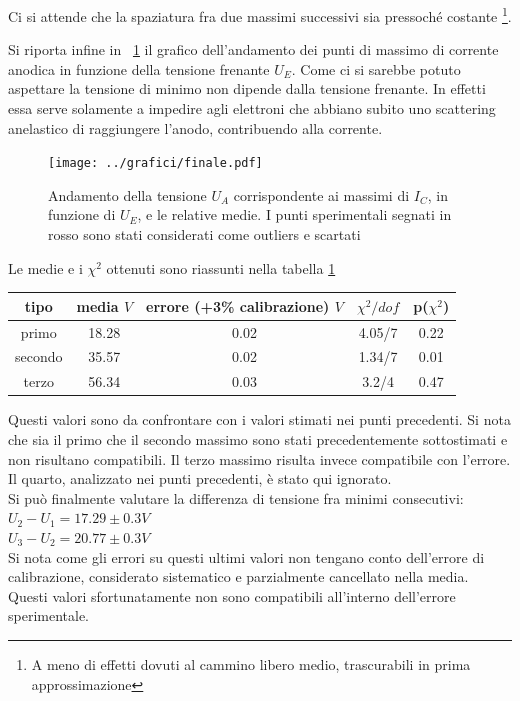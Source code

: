 \documentclass[10pt,a4paper]{article}
\begin{document}
Ci si attende che la spaziatura fra due massimi successivi sia pressoché costante \footnote{A meno di effetti dovuti al cammino libero medio, trascurabili in prima approssimazione}.


Si riporta infine in \figurename{~\ref{fig:final}} il grafico dell'andamento dei punti di massimo di corrente anodica in funzione della tensione frenante $U_E$. Come ci si sarebbe potuto aspettare la tensione di minimo non dipende dalla tensione frenante. In effetti essa serve solamente a impedire agli elettroni che abbiano subito uno scattering anelastico di raggiungere l'anodo, contribuendo alla corrente. 

\begin{figure}[h!]
	\centering
	\texttt{[image: ../grafici/finale.pdf]}
	\caption{Andamento della tensione $U_A$ corrispondente ai massimi di $I_C$, in funzione di $U_E$, e le relative medie. I punti sperimentali segnati in rosso sono stati considerati come outliers e scartati}
	\label{fig:final}
\end{figure}

Le medie e i $\chi^2$ ottenuti sono riassunti nella tabella \ref{tab:finale} \\
\begin{table}[h!]
	\centering
	\begin{tabular}{c|c|c|c|c}
		\hline
		tipo & media $V$ & errore (+3\% calibrazione) $V$ & $\chi^2/dof$ & p($\chi^2$) \\
		\hline 
		primo & 18.28 &0.02 &4.05/7 & 0.22\\
		secondo& 35.57 & 0.02& 1.34/7 & 0.01\\
		terzo & 56.34 & 0.03 &3.2/4 & 0.47\\
		\hline

	\end{tabular}
	\label{tab:finale}
\end{table}

Questi valori sono da confrontare con i valori stimati nei punti precedenti. Si nota che sia il primo che il secondo massimo sono stati precedentemente sottostimati e non risultano compatibili. Il terzo massimo risulta invece compatibile con l'errore. Il quarto, analizzato nei punti precedenti, è stato qui ignorato.\\
Si può finalmente valutare la differenza di tensione fra minimi consecutivi:\\
$U_2-U_1=17.29 \pm 0.3 V$ \\
$U_3-U_2=20.77 \pm 0.3 V$\\
Si nota come gli errori su questi ultimi valori non tengano conto dell'errore di calibrazione, considerato sistematico e parzialmente cancellato nella media.
Questi valori sfortunatamente non sono compatibili all'interno dell'errore sperimentale.
 
\end{document}
